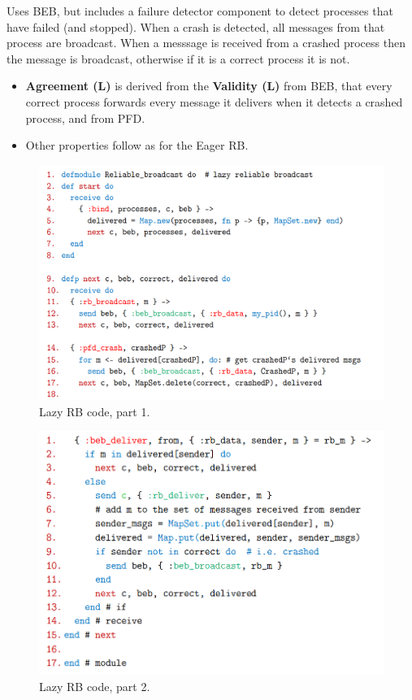 \documentclass[11pt]{article}
\begin{document}
Uses BEB, but includes a failure detector component to detect processes that have failed (and stopped).
When a crash is detected, all messages from that process are broadcast.
When a messsage is received from a crashed process then the message is broadcast, otherwise if it is a correct process it is not.

\begin{itemize}
  \item \textbf{Agreement (L)} is derived from the \textbf{Validity (L)} from BEB, that every correct process forwards every message it delivers when it detects a crashed process, and from PFD.
  \item Other properties follow as for the Eager RB.
\end{itemize}

\begin{figure}[htb!]
  \centering
  \caption{Lazy RB code, part 1.}
  \includegraphics[scale=0.3]{lazycode1}
\end{figure}

\begin{figure}[htb!]
  \centering
  \caption{Lazy RB code, part 2.}
  \includegraphics[scale=0.3]{lazycode2}
\end{figure}
\end{document}
